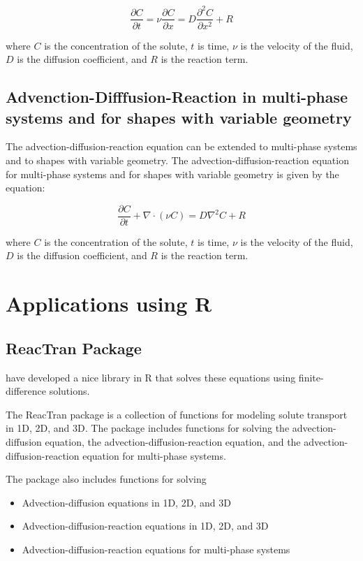 \documentclass{tufte-handout}\usepackage[]{graphicx}\usepackage[]{xcolor}
\begin{document}
\begin{equation}
\frac{\partial C}{\partial t} = \nu \frac{\partial C}{\partial x} = D \frac{\partial^2 C}{\partial x^2} + R
\end{equation}

where $C$ is the concentration of the solute, $t$ is time, $\nu$ is the velocity of the fluid, $D$ is the diffusion coefficient, and $R$ is the reaction term.

  
\subsection{Advenction-Difffusion-Reaction in multi-phase systems and for shapes with variable geometry}

The advection-diffusion-reaction equation can be extended to multi-phase systems and to shapes with variable geometry. The advection-diffusion-reaction equation for multi-phase systems and for shapes with variable geometry is given by the equation:

\begin{equation}
\frac{\partial C}{\partial t} + \nabla \cdot (\nu C) = D \nabla^2 C + R
\end{equation}

where $C$ is the concentration of the solute, $t$ is time, $\nu$ is the velocity of the fluid, $D$ is the diffusion coefficient, and $R$ is the reaction term.
  
\section{Applications using R}

\subsection{ReacTran Package}

\citet{soetaert2017package} have developed a nice library in R that solves these equations using finite-difference solutions. 

The ReacTran package is a collection of functions for modeling solute transport in 1D, 2D, and 3D. The package includes functions for solving the advection-diffusion equation, the advection-diffusion-reaction equation, and the advection-diffusion-reaction equation for multi-phase systems. 

The package also includes functions for solving

\begin{itemize}
\item Advection-diffusion equations in 1D, 2D, and 3D 
\item Advection-diffusion-reaction equations in 1D, 2D, and 3D
\item Advection-diffusion-reaction equations for multi-phase systems
\end{itemize}
\end{document}
